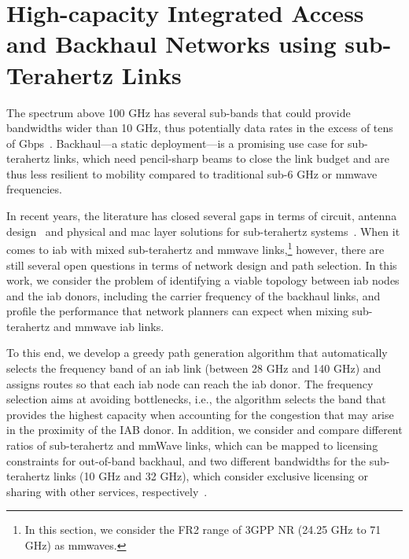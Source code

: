 


\section{High-capacity Integrated Access and Backhaul Networks using sub-Terahertz Links}
\label{sec:iab-wons}

The spectrum above 100 GHz has several sub-bands that could provide bandwidths wider than 10 GHz, thus potentially data rates in the excess of tens of Gbps~\cite{akyildiz2014terahertz}. Backhaul---a static deployment---is a promising use case for sub-terahertz links, which need pencil-sharp beams to close the link budget and are thus less resilient to mobility compared to traditional sub-6 GHz or \gls{mmwave} frequencies. 

In recent years, the literature has closed several gaps in terms of circuit, antenna design~\cite{singh2020design} and physical and \gls{mac} layer solutions for sub-terahertz systems~\cite{ghafoor2020mac}.
%
When it comes to \gls{iab} with mixed sub-terahertz and \gls{mmwave} links,\footnote{In this section, we consider the FR2 range of 3GPP NR (24.25 GHz to 71 GHz) as \glspl{mmwave}.} however, there are still several open questions in terms of network design and path selection. In this work, we consider the problem of identifying a viable topology between \gls{iab} nodes and the \gls{iab} donors, including the carrier frequency of the backhaul links, and profile the performance that network planners can expect when mixing sub-terahertz and \gls{mmwave} \gls{iab} links.

To this end, 
%
we develop a greedy path generation algorithm that automatically selects the frequency band of an \gls{iab} link (between 28 GHz and 140 GHz) and assigns routes so that each \gls{iab} node can reach the \gls{iab} donor. The frequency selection aims at avoiding bottlenecks, i.e., the algorithm selects the band that provides the highest capacity when accounting for the congestion that may arise in the proximity of the IAB donor. In addition, we consider and compare different ratios of sub-terahertz and mmWave links, which can be mapped to licensing constraints for out-of-band backhaul, and two different bandwidths for the sub-terahertz links (10 GHz and 32 GHz), which consider exclusive licensing or sharing with other services, respectively~\cite{polese2022dynamic}.

